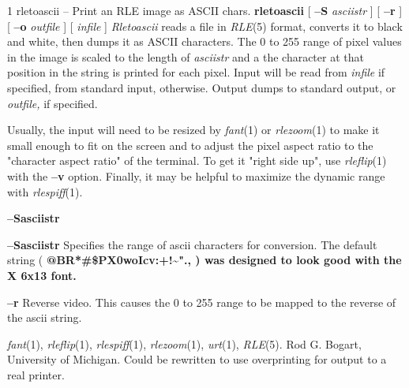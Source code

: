 %
%
%
 1
rletoascii -- Print an RLE image as ASCII chars.
{\bf rletoascii}
[
{\bf --S}
{\it asciistr}
] [
{\bf --r}
] [
{\bf --o}
{\it outfile}
] [
{\it infile}
]
{\it Rletoascii}
reads a file in
{\it RLE}{\rm (5)}
format, converts it to black and white, then dumps it as ASCII characters. 
The 0 to 255 range of pixel values in
the image is scaled to the length of
{\it asciistr}
and a the character at that position in the string is printed for each pixel.
Input will be read from
{\it infile}
if specified, from standard input, otherwise.  Output dumps to 
standard output, or
{\it outfile,} 
if specified.

Usually, the input will need to be resized by
{\it fant}{\rm (1)}
or
{\it rlezoom}{\rm (1)}
to make it small enough to fit on the screen and to adjust the pixel aspect
ratio to the "character aspect ratio" of the terminal.  To get it
"right side up", use
{\it rleflip}{\rm (1)}
with the
{\bf --v}
option.  Finally, it may be helpful to maximize the dynamic range with
{\it rlespiff}{\rm (1).}
\begin{TPlist}{{\bf --S}{\it }{\bf asciistr}
}
\item[{{\bf --S}{\it }{\bf asciistr}
}]
Specifies the range of ascii characters for conversion.  The default string
(%
\bf @BR*\#\$PX0woIcv:+!\~{}"., \rm%
)
was designed to look good with the X 6x13 font.  
\item[{{\bf --r}}]
Reverse video.  This causes the 0 to 255 range to be mapped to the reverse of
the ascii string.
\end{TPlist}
{\it fant}{\rm (1),}
{\it rleflip}{\rm (1),}
{\it rlespiff}{\rm (1),}
{\it rlezoom}{\rm (1),}
{\it urt}{\rm (1),}
{\it RLE}{\rm (5).}
Rod G. Bogart, University of Michigan.
Could be rewritten to use overprinting for output to a real printer.
\newpage



